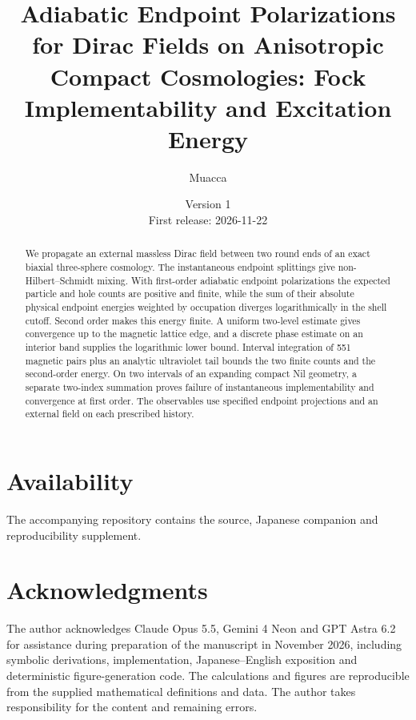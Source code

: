 \documentclass[11pt,a4paper]{article}
\title{Adiabatic Endpoint Polarizations for Dirac Fields on Anisotropic Compact Cosmologies: Fock Implementability and Excitation Energy}
\author{Muacca}
\date{Version 1\\First release: 2026-11-22}
\begin{document}
\maketitle
\begin{abstract}
We propagate an external massless Dirac field between two round ends of an exact biaxial three-sphere cosmology. The instantaneous endpoint splittings give non-Hilbert--Schmidt mixing. With first-order adiabatic endpoint polarizations the expected particle and hole counts are positive and finite, while the sum of their absolute physical endpoint energies weighted by occupation diverges logarithmically in the shell cutoff. Second order makes this energy finite. A uniform two-level estimate gives convergence up to the magnetic lattice edge, and a discrete phase estimate on an interior band supplies the logarithmic lower bound. Interval integration of 551 magnetic pairs plus an analytic ultraviolet tail bounds the two finite counts and the second-order energy. On two intervals of an expanding compact Nil geometry, a separate two-index summation proves failure of instantaneous implementability and convergence at first order. The observables use specified endpoint projections and an external field on each prescribed history.
\end{abstract}







\section*{Availability}
The accompanying repository contains the source, Japanese companion and reproducibility supplement.
\section*{Acknowledgments}
The author acknowledges Claude Opus 5.5, Gemini 4 Neon and GPT Astra 6.2 for assistance during preparation of the manuscript in November 2026, including symbolic derivations, implementation, Japanese--English exposition and deterministic figure-generation code. The calculations and figures are reproducible from the supplied mathematical definitions and data. The author takes responsibility for the content and remaining errors.
\end{document}
